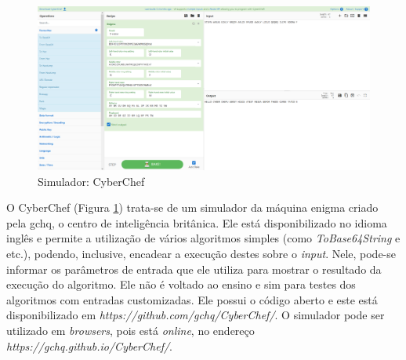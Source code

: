 \begin{figure}[H]
    \centering
    \caption{Simulador: CyberChef}
    \label{fig:cyberchef}
    \includegraphics[width=1.2\linewidth,center]{Simuladores/CyberChef_Enigma.png}
\end{figure}

O CyberChef (Figura \ref{fig:cyberchef}) trata-se de um simulador da máquina enigma criado pela \acrfull{gchq}, o centro de inteligência britânica. Ele está disponibilizado no idioma inglês e permite a utilização de vários algoritmos simples (como \textit{ToBase64String} e etc.), podendo, inclusive, encadear a execução destes sobre o \textit{input}. Nele, pode-se informar os parâmetros de entrada que ele utiliza para mostrar o resultado da execução do algoritmo. Ele não é voltado ao ensino e sim para testes dos algoritmos com entradas customizadas. Ele possui o código aberto e este está disponibilizado em \textit{https://github.com/gchq/CyberChef/}. O simulador pode ser utilizado em \textit{browsers}, pois está \textit{online}, no endereço \textit{https://gchq.github.io/CyberChef/}. \cite{gchq20}


